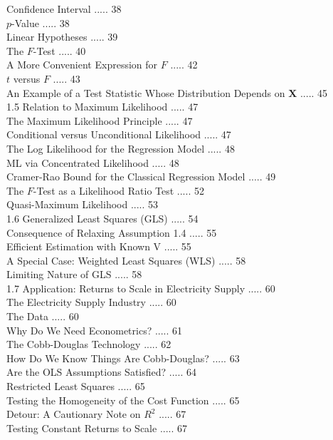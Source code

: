 \documentclass[10pt]{article}
\begin{document}
Confidence Interval ..... 38\\
$p$-Value ..... 38\\
Linear Hypotheses ..... 39\\
The $F$-Test ..... 40\\
A More Convenient Expression for $F$ ..... 42\\
$t$ versus $F$ ..... 43\\
An Example of a Test Statistic Whose Distribution Depends on $\mathbf{X}$ ..... 45\\
1.5 Relation to Maximum Likelihood ..... 47\\
The Maximum Likelihood Principle ..... 47\\
Conditional versus Unconditional Likelihood ..... 47\\
The Log Likelihood for the Regression Model ..... 48\\
ML via Concentrated Likelihood ..... 48\\
Cramer-Rao Bound for the Classical Regression Model ..... 49\\
The $F$-Test as a Likelihood Ratio Test ..... 52\\
Quasi-Maximum Likelihood ..... 53\\
1.6 Generalized Least Squares (GLS) ..... 54\\
Consequence of Relaxing Assumption 1.4 ..... 55\\
Efficient Estimation with Known V ..... 55\\
A Special Case: Weighted Least Squares (WLS) ..... 58\\
Limiting Nature of GLS ..... 58\\
1.7 Application: Returns to Scale in Electricity Supply ..... 60\\
The Electricity Supply Industry ..... 60\\
The Data ..... 60\\
Why Do We Need Econometrics? ..... 61\\
The Cobb-Douglas Technology ..... 62\\
How Do We Know Things Are Cobb-Douglas? ..... 63\\
Are the OLS Assumptions Satisfied? ..... 64\\
Restricted Least Squares ..... 65\\
Testing the Homogeneity of the Cost Function ..... 65\\
Detour: A Cautionary Note on $R^{2}$ ..... 67\\
Testing Constant Returns to Scale ..... 67\\
\end{document}
